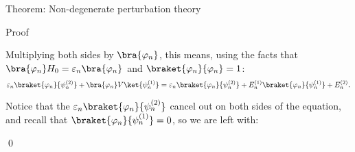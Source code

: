 \documentclass[a4paper]{article}
\begin{document}
\begin{parag}{Theorem: Non-degenerate perturbation theory}
\begin{subparag}{Proof}
\begin{enumerate}[left=0pt]
        Multiplying both sides by $\bra{\phi_n}$, this means, using the facts that $\bra{\phi_n} H_0 = \epsilon_n \bra{\phi_n}$ and $\braket{\phi_n}{\phi_n} = 1$: 
        \[\epsilon_n \braket{\phi_n}{\psi_n^{\left(2\right)}} + \bra{\phi_n} V \ket{\psi_n^{\left(1\right)}} = \epsilon_n \braket{\phi_n}{\psi_n^{\left(2\right)}} + E_n^{\left(1\right)} \braket{\phi_n}{\psi_n^{\left(1\right)}} + E_n^{\left(2\right)}.\]

        Notice that the $\epsilon_n \braket{\phi_n}{\psi_n^{\left(2\right)}}$ cancel out on both sides of the equation, and recall that $\braket{\phi_n}{\psi_n^{\left(1\right)}} = 0$, so we are left with: 
        \end{enumerate}

        \qed
    \end{subparag}
\end{parag}
\end{document}
